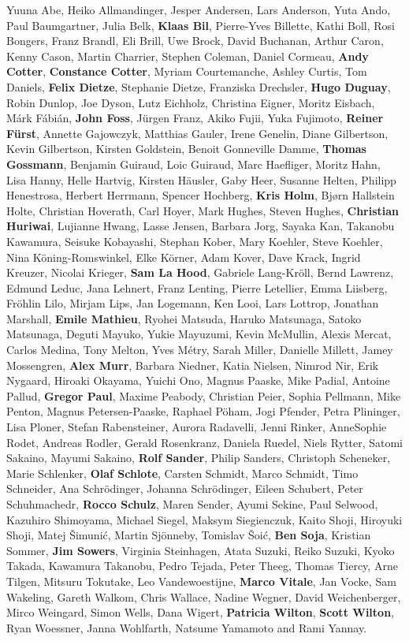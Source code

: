 \begingroup
\fontsize{10pt}{10pt}\selectfont
Yuuna Abe,
Heiko Allmandinger,
Jesper Andersen,
Lars Anderson,
Yuta Ando,
Paul Baumgartner,
Julia Belk,
\textbf{Klaas Bil},
Pierre-Yves Billette,
Kathi Boll,
Rosi Bongers,
Franz Brandl,
Eli Brill,
Uwe Brock,
David Buchanan,
Arthur Caron,
Kenny Cason,
Martin  Charrier,
Stephen Coleman,
Daniel Cormeau,
\textbf{Andy Cotter},
\textbf{Constance Cotter},
Myriam Courtemanche,
Ashley  Curtis,
Tom Daniels,
\textbf{Felix Dietze},
Stephanie Dietze,
Franziska Drechsler,
\textbf{Hugo Duguay},
Robin Dunlop,
Joe Dyson,
Lutz Eichholz,
Christina Eigner,
Moritz Eisbach,
Márk  Fábián,
\textbf{John Foss},
Jürgen  Franz,
Akiko Fujii,
Yuka Fujimoto,
\textbf{Reiner Fürst},
Annette Gajowczyk,
Matthias Gauler,
Irene Genelin,
Diane Gilbertson,
Kevin Gilbertson,
Kirsten Goldstein,
Benoit Gonneville Damme,
\textbf{Thomas Gossmann},
Benjamin Guiraud,
Loic Guiraud,
Marc Haefliger,
Moritz Hahn,
Lisa Hanny,
Helle Hartvig,
Kirsten Häusler,
Gaby Heer,
Susanne Helten,
Philipp Henestrosa,
Herbert Herrmann,
Spencer Hochberg,
\textbf{Kris Holm},
Bjørn Hallstein Holte,
Christian Hoverath,
Carl Hoyer,
Mark Hughes,
Steven Hughes,
\textbf{Christian Huriwai},
Lujianne Hwang,
Lasse Jensen,
Barbara Jorg,
Sayaka Kan,
Takanobu Kawamura,
Seisuke Kobayashi,
Stephan Kober,
Mary Koehler,
Steve Koehler,
Nina Köning-Romswinkel,
Elke Körner,
Adam Kover,
Dave Krack,
Ingrid Kreuzer,
Nicolai Krieger,
\textbf{Sam La Hood},
Gabriele Lang-Kröll,
Bernd Lawrenz,
Edmund Leduc,
Jana Lehnert,
Franz Lenting,
Pierre Letellier,
Emma Liisberg,
Fröhlin Lilo,
Mirjam  Lips,
Jan Logemann,
Ken Looi,
Lars Lottrop,
Jonathan Marshall,
\textbf{Emile Mathieu},
Ryohei Matsuda,
Haruko Matsunaga,
Satoko Matsunaga,
Deguti Mayuko,
Yukie Mayuzumi,
Kevin McMullin,
Alexis  Mercat,
Carlos Medina,
Tony Melton,
Yves Métry,
Sarah Miller,
Danielle Millett,
Jamey Mossengren,
\textbf{Alex  Murr},
Barbara Niedner,
Katia Nielsen,
Nimrod Nir,
Erik Nygaard,
Hiroaki Okayama,
Yuichi Ono,
Magnus Paaske,
Mike Padial,
Antoine Pallud,
\textbf{Gregor Paul},
Maxime Peabody,
Christian Peier,
Sophia Pellmann,
Mike Penton,
Magnus Petersen-Paaske,
Raphael Pöham,
Jogi Pfender,
Petra Plininger,
Lisa Ploner,
Stefan Rabensteiner,
Aurora Radavelli,
Jenni Rinker,
AnneSophie Rodet,
Andreas Rodler,
Gerald  Rosenkranz,
Daniela Ruedel,
Niels Rytter,
Satomi Sakaino,
Mayumi Sakaino,
\textbf{Rolf Sander},
Philip  Sanders,
Christoph Scheneker,
Marie Schlenker,
\textbf{Olaf Schlote},
Carsten Schmidt,
Marco Schmidt,
Timo Schneider,
Ana Schrödinger,
Johanna Schrödinger,
Eileen Schubert,
Peter Schuhmachedr,
\textbf{Rocco Schulz},
Maren Sender,
Ayumi Sekine,
Paul Selwood,
Kazuhiro Shimoyama,
Michael Siegel,
Maksym  Siegienczuk,
Kaito Shoji,
Hiroyuki Shoji,
Matej Šimunić,
Martin Sjönneby,
Tomislav Šoić,
\textbf{Ben Soja},
Kristian Sommer,
\textbf{Jim Sowers},
Virginia Steinhagen,
Atata Suzuki,
Reiko Suzuki,
Kyoko Takada,
Kawamura Takanobu,
Pedro Tejada,
Peter Theeg,
Thomas  Tiercy,
Arne Tilgen,
Mitsuru Tokutake,
Leo Vandewoestijne,
\textbf{Marco Vitale},
Jan Vocke,
Sam Wakeling,
Gareth Walkom,
Chris Wallace,
Nadine Wegner,
David Weichenberger,
Mirco Weingard,
Simon Wells,
Dana Wigert,
\textbf{Patricia  Wilton},
\textbf{Scott Wilton},
Ryan Woessner,
Janna Wohlfarth,
Natsume Yamamoto
and
Rami Yannay.
\endgroup
